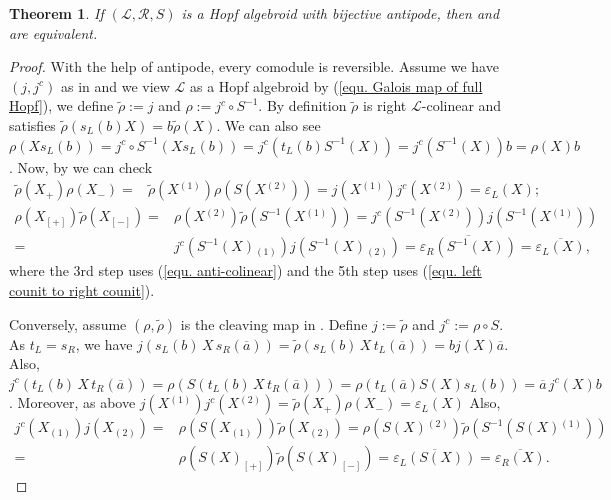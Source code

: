 \documentclass[a4paper,reqno]{amsart}
\numberwithin{equation}{section}
\theoremstyle{plain}
\newtheorem{thm}{Theorem}[section]
\theoremstyle{remark}
\numberwithin{equation}{section}
\newcommand\ol{\overline}
\newcommand{\cL}{\mathcal{L}}
\newcommand{\teins}[1]{{#1}{}{}^{\scriptscriptstyle{(1)}}}
\newcommand{\tzwei}[1]{{#1}{}{}^{\scriptscriptstyle{(2)}}}
\newcommand{\trho}{{\tilde{\rho}}}
\renewcommand{\o}{{}_{\scriptscriptstyle{(1)}}}
\renewcommand{\t}{{}_{\scriptscriptstyle{(2)}}}
\newcommand{\CR}{\mathcal{R}}
\newcommand{\CL}{\mathcal{L}}
\begin{document}
\begin{thm}
    If $(\CL,\CR, S)$ is a Hopf algebroid  with bijective antipode, then  and  are equivalent.
\end{thm}
\begin{proof}
 With the help of antipode, every comodule is  reversible.   Assume we have $(j,j^c)$ as in   and we view $\cL$ as a Hopf algebroid by (\ref{equ. Galois map of full Hopf}), we define $\trho:=j$ and $\rho:=j^{c}\circ S^{-1}$. By definition $\trho$ is right $\cL$-colinear and satisfies $\trho(s_{L}(b)X)=b\trho(X)$. We can also see $\rho(Xs_{L}(b))=j^{c}\circ S^{-1}(Xs_{L}(b))=j^{c}(t_{L}(b)S^{-1}(X))=j^{c}(S^{-1}(X))b=\rho(X)b$. Now, by  we can check 
     \begin{align*}
         \trho(X_{+})\rho(X_{-})=& \trho(X\teins{})\rho(S(X\tzwei{}))
         =j(X\teins{})j^{c}(X\tzwei{})=\varepsilon_{L}(X);
     \end{align*}
     \begin{align*}
         \rho(X_{[+]})\trho(X_{[-]})=&\rho(X\tzwei{})\trho(S^{-1}(X\teins{}))=j^{c}( S^{-1}(X\tzwei{}))j(S^{-1}(X\teins{}))\\
         =&j^{c}( S^{-1}(X)\o)j(S^{-1}(X)\t)=\overline{\varepsilon_{R}(S^{-1}(X))}=\overline{\varepsilon_{L}(X)},
     \end{align*}
     where the 3rd step uses (\ref{equ. anti-colinear}) and the 5th step uses (\ref{equ. left counit to right counit}). 

     Conversely, assume $(\rho,\trho)$ is the cleaving map in . Define $j:=\trho$ and $j^{c}:=\rho\circ S$. As $t_{L}=s_{R}$, we have $j(s_{L}(b)\,X\,s_{R}(\ol a))=\trho(s_{L}(b)\,X\,t_{L}(\ol a))=bj(X)\ol a$. Also, $j^{c}(t_{L}(b)\,X\,t_{R}(\ol a))=\rho(S(t_{L}(b)\,X\,t_{R}(\ol a)))=\rho(t_{L}(\ol a)S(X)s_{L}(b))=\ol a \,j^{c}(X)b$. Moreover, as above $j(X\teins{})j^{c}(X\tzwei{})=\trho(X_{+})\rho(X_{-})=\varepsilon_{L}(X)$ Also,
     \begin{align*}
         j^{c}(X\o)j(X\t)=&\rho(S(X\o))\trho(X\t)=\rho(S(X)\tzwei{})\trho(S^{-1}(S(X)\teins{}))\\
         =&\rho(S(X)_{[+]})\trho(S(X)_{[-]})=\overline{\varepsilon_{L}(S(X))}=\overline{\varepsilon_{R}(X)}.
     \end{align*}
 \end{proof}
\end{document}
